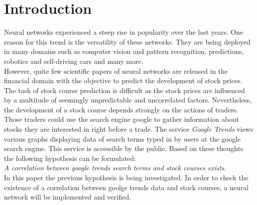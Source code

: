 \section{Introduction}
\label{sec:introduction}
Neural networks experienced a steep rise in popularity over the last years. One reason for this trend is the versatility of these networks. They are being deployed in many domains such as computer vision and pattern recognition, predictions, robotics and self-driving cars and many more. 
\\
However, quite few scientific papers of neural networks are released in the financial domain with the objective to predict the development of stock prices. 
The task of stock course prediction is difficult as the stock prices are influenced by a multitude of seemingly unpredictable and uncorrelated factors. Nevertheless, the development of a stock course depends strongly on the actions of traders. Those traders could use the search engine google to gather information about stocks they are interested in right before a trade. The service \textit{Google Trends} views various graphs displaying data of search terms typed in by users at the google search engine. This service is accessible by the public. Based on these thoughts the following hypothesis can be formulated: 
\\
\textit{A correlation between google trends search terms and stock courses exists. } 
\\
In this paper the previous hypothesis is being investigated. In order to check the existence of a correlation between goolge trends data and stock courses, a neural network will be implemented and verified. 